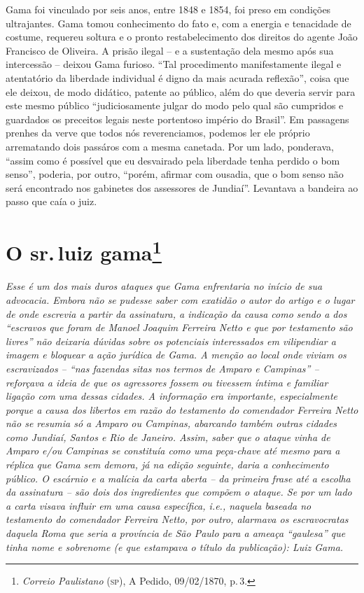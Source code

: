 \begin{argumento}
{Gama foi vinculado por seis anos, entre 1848 e 1854, foi preso em
condições ultrajantes. Gama tomou conhecimento do fato e, com a energia
e tenacidade de costume, requereu soltura e o pronto restabelecimento
dos direitos do agente João Francisco de Oliveira. A prisão ilegal -- e
a sustentação dela mesmo após sua intercessão -- deixou Gama furioso.
``Tal procedimento manifestamente ilegal e atentatório da liberdade
individual é digno da mais acurada reflexão'', coisa que ele deixou, de
modo didático, patente ao público, além do que deveria servir para este
mesmo público ``judiciosamente julgar do modo pelo qual são cumpridos e
guardados os preceitos legais neste portentoso império do Brasil''. Em
passagens prenhes da verve que todos nós reverenciamos, podemos ler ele
próprio arrematando dois passáros com a mesma canetada. Por um lado,
ponderava, ``assim como é possível que eu desvairado pela liberdade tenha
perdido o bom senso'', poderia, por outro, ``porém, afirmar com ousadia,
que o bom senso não será encontrado nos gabinetes dos assessores de
Jundiaí''. Levantava a bandeira ao passo que caía o juiz.}
\end{argumento}

\chapter{O sr.\,luiz gama\footnote{\emph{Correio Paulistano} (\textsc{sp}), A Pedido, 09/02/1870,
  p.\,3.}} %

\begin{didascalia}
\emph{Esse é um dos mais duros ataques que Gama enfrentaria no início de
sua advocacia. Embora não se pudesse saber com exatidão o autor do
artigo e o lugar de onde escrevia a partir da assinatura, a indicação da
causa como sendo a dos ``escravos que foram de Manoel Joaquim Ferreira
Netto e que por testamento são livres'' não deixaria dúvidas sobre os
potenciais interessados em vilipendiar a imagem e bloquear a ação
jurídica de Gama. A menção ao local onde viviam os escravizados -- ``nas
fazendas sitas nos termos de Amparo e Campinas'' -- reforçava a ideia de
que os agressores fossem ou tivessem íntima e familiar ligação com uma
dessas cidades. A informação era importante, especialmente porque a
causa dos libertos em razão do testamento do comendador Ferreira Netto
não se resumia só a Amparo ou Campinas, abarcando também outras cidades
como Jundiaí, Santos e Rio de Janeiro. Assim, saber que o ataque vinha
de Amparo e/ou Campinas se constituía como uma peça-chave até mesmo para
a réplica que Gama sem demora, já na edição seguinte, daria a
conhecimento público. O escárnio e a malícia da carta aberta -- da
primeira frase até a escolha da assinatura -- são dois dos ingredientes
que compõem o ataque. Se por um lado a carta visava influir em uma causa
específica, i.e., naquela baseada no testamento do comendador Ferreira
Netto, por outro, alarmava os escravocratas daquela Roma que seria a
província de São Paulo para a ameaça ``gaulesa'' que tinha nome e sobrenome
(e que estampava o título da publicação): Luiz Gama.}
\end{didascalia}


